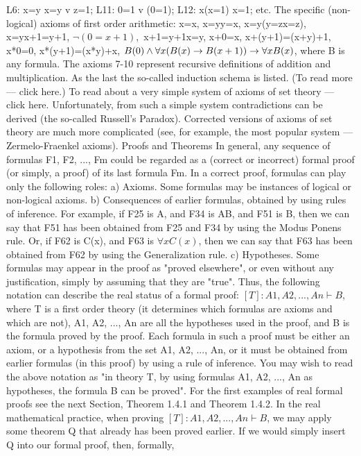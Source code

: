 L6: x=y \IMPLIES  x=y v z=1;
L11: 0=1 v \neg (0=1);
L12: \forall x(x=1) \IMPLIES  x=1;
etc.
The specific (non-logical) axioms of first order arithmetic:
x=x,
x=y\IMPLIES y=x,
x=y\IMPLIES (y=z\IMPLIES x=z),
x=y\IMPLIES x+1=y+1,
\(\neg (0=x+1),\)
x+1=y+1\IMPLIES x=y,
x+0=x,
x+(y+1)=(x+y)+1,
x*0=0,
x*(y+1)=(x*y)+x,
\(B(0) \wedge  \forall x(B(x)\rightarrow B(x+1))\rightarrow \forall xB(x)\), where B is any formula.
The axioms 7-10 represent recursive definitions of addition and multiplication. As the last the so-called induction schema is
listed. (To read more --- click here.)
To read about a very simple system of axioms of set theory --- click here. Unfortunately, from such a simple system
contradictions can be derived (the so-called Russell's Paradox). Corrected versions of axioms of set theory are much more
complicated (see, for example, the most popular system --- Zermelo-Fraenkel axioms).
Proofs and Theorems
In general, any sequence of formulas F1, F2, ..., Fm could be regarded as a (correct or incorrect) formal
proof (or simply, a proof) of its last formula Fm. In a correct proof, formulas can play only the following
roles:
a) Axioms. Some formulas may be instances of logical or non-logical axioms.
b) Consequences of earlier formulas, obtained by using rules of inference. For example, if F25 is A, and
F34 is A\IMPLIES B, and F51 is B, then we can say that F51 has been obtained from F25 and F34 by using the
Modus Ponens rule. Or, if F62 is C(x), and F63 is \(\forall xC(x)\), then we can say that F63 has been obtained
from F62 by using the Generalization rule.
c) Hypotheses. Some formulas may appear in the proof as "proved elsewhere", or even without any
justification, simply by assuming that they are "true".
Thus, the following notation can describe the real status of a formal proof:
\([T]: A1, A2, ..., An \vdash B\),
where T is a first order theory (it determines which formulas are axioms and which are not), A1, A2, ..., An
are all the hypotheses used in the proof, and B is the formula proved by the proof. Each formula in such a
proof must be either an axiom, or a hypothesis from the set A1, A2, ..., An, or it must be obtained from
earlier formulas (in this proof) by using a rule of inference. You may wish to read the above notation as
"in theory T, by using formulas A1, A2, ..., An as hypotheses, the formula B can be proved".
For the first examples of real formal proofs see the next Section, Theorem 1.4.1 and Theorem 1.4.2.
In the real mathematical practice, when proving \([T]: A1, A2, ..., An \vdash B\), we may apply some theorem Q
that already has been proved earlier. If we would simply insert Q into our formal proof, then, formally,
